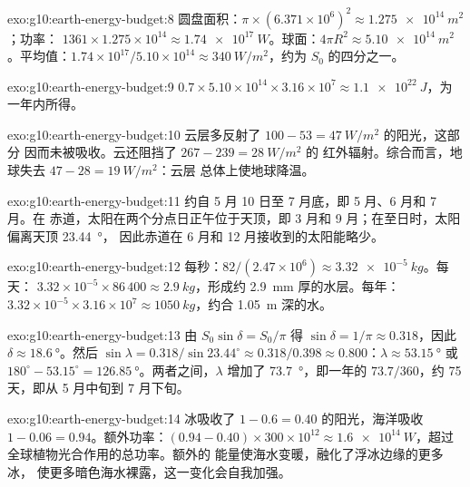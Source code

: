 \begin{solution}{exo:g10:earth-energy-budget:8}
圆盘面积：$\pi \times (6.371\times10^6)^2 \approx \qty{1.275e14}{m^2}$；功率：
$1361 \times 1.275\times10^{14} \approx \qty{1.74e17}{W}$。球面：$4\pi
R^2 \approx \qty{5.10e14}{m^2}$。平均值：$1.74\times10^{17}/5.10\times
10^{14} \approx \qty{340}{W/m^2}$，约为 $S_0$ 的四分之一。
\end{solution}

\begin{solution}{exo:g10:earth-energy-budget:9}
$0.7 \times 5.10\times10^{14} \times 3.16\times10^7 \approx
\qty{1.1e22}{J}$，为一年内所得。
\end{solution}

\begin{solution}{exo:g10:earth-energy-budget:10}
云层多反射了 $100 - 53 = \qty{47}{W/m^2}$ 的阳光，这部分
因而未被吸收。云还阻挡了 $267 - 239 = \qty{28}{W/m^2}$ 的
红外辐射。综合而言，地球失去 $47 - 28 = \qty{19}{W/m^2}$：云层
总体上使地球降温。
\end{solution}

\begin{solution}{exo:g10:earth-energy-budget:11}
约自 5 月 10 日至 7 月底，即 5 月、6 月和 7 月。在
赤道，太阳在两个分点日正午位于天顶，即 3 月和
9 月；在至日时，太阳偏离天顶 \qty{23.44}{\degree}，
因此赤道在 6 月和 12 月接收到的太阳能略少。
\end{solution}

\begin{solution}{exo:g10:earth-energy-budget:12}
每秒：$82/(2.47\times10^6) \approx \qty{3.32e-5}{kg}$。每天：
$3.32\times10^{-5} \times 86\,400 \approx \qty{2.9}{kg}$，形成约
\qty{2.9}{mm} 厚的水层。每年：$3.32\times10^{-5} \times 3.16\times10^7 \approx
\qty{1050}{kg}$，约合 \qty{1.05}{m} 深的水。
\end{solution}

\begin{solution}{exo:g10:earth-energy-budget:13}
由 $S_0 \sin\delta = S_0/\pi$ 得 $\sin\delta = 1/\pi \approx 0.318$，因此
$\delta \approx \qty{18.6}{\degree}$。然后 $\sin\lambda = 0.318/\sin 23.44^\circ
\approx 0.318/0.398 \approx 0.800$：$\lambda \approx \qty{53.15}{\degree}$ 或
$180^\circ - 53.15^\circ = \qty{126.85}{\degree}$。两者之间，$\lambda$
增加了 \qty{73.7}{\degree}，即一年的 $73.7/360$，约
\num{75} 天，即从 5 月中旬到 7 月下旬。
\end{solution}

\begin{solution}{exo:g10:earth-energy-budget:14}
冰吸收了 $1 - 0.6 = 0.40$ 的阳光，海洋吸收 $1 - 0.06 =
0.94$。额外功率：$(0.94 - 0.40) \times 300 \times 10^{12} \approx
\qty{1.6e14}{W}$，超过全球植物光合作用的总功率。额外的
能量使海水变暖，融化了浮冰边缘的更多冰，
使更多暗色海水裸露，这一变化会自我加强。
\end{solution}

